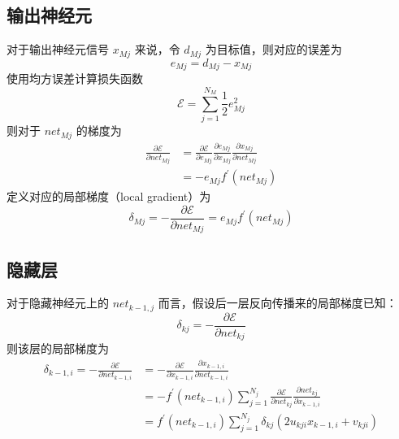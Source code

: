     \subsection{输出神经元}
        对于输出神经元信号 $x_{Mj}$ 来说，令 $d_{Mj}$ 为目标值，则对应的误差为
        \begin{equation*}
            e_{Mj} = d_{Mj} - x_{Mj}
        \end{equation*}
        使用均方误差计算损失函数
        \begin{equation}\label{eq:loss}
            \mathcal{E} = \sum_{j=1}^{N_{M}}\frac{1}{2}e_{Mj}^2
        \end{equation}
        则对于 $\mathit{net}_{Mj}$ 的梯度为
        \begin{align*}
            \frac{\partial\mathcal{E}}{\partial net_{Mj}} &= \frac{\partial\mathcal{E}}{\partial e_{Mj}}\frac{\partial e_{Mj}}{\partial x_{Mj}}\frac{\partial x_{Mj}}{\partial \mathit{net}_{Mj}} \\
            &= -e_{Mj}f^\prime(\mathit{net}_{Mj})
        \end{align*}
        定义对应的局部梯度（local gradient）为
        \begin{equation}\label{eq:outlocalgrad}
            \delta_{Mj} = -\frac{\partial\mathcal{E}}{\partial net_{Mj}} = e_{Mj}f^\prime(\mathit{net}_{Mj})
        \end{equation}
    \subsection{隐藏层}
    对于隐藏神经元上的 $net_{k-1,j}$ 而言，假设后一层反向传播来的局部梯度已知：
    \begin{equation*}
        \delta_{kj} = -\frac{\partial\mathcal{E}}{\partial\mathit{net}_{kj}}
    \end{equation*}
    则该层的局部梯度为
    \begin{align}
        \delta_{k-1,i} = -\frac{\partial\mathcal{E}}{\partial\mathit{net}_{k-1,i}} &= -\frac{\partial\mathcal{E}}{\partial x_{k-1,i}}\frac{\partial x_{k-1,i}}{\partial\mathit{net}_{k-1,i}} \nonumber\\
        &= -f^\prime(\mathit{net}_{k-1,i})\sum_{j=1}^{N_j}\frac{\partial\mathcal{E}}{\partial\mathit{net}_{kj}}\frac{\partial\mathit{net}_{kj}}{\partial x_{k-1,i}} \nonumber\\
        &= f^\prime(\mathit{net}_{k-1,i})\sum_{j=1}^{N_j}\delta_{kj}(2u_{kji}x_{k-1,i}+v_{kji})\label{eq:hiddenlocalgrad}
    \end{align}
